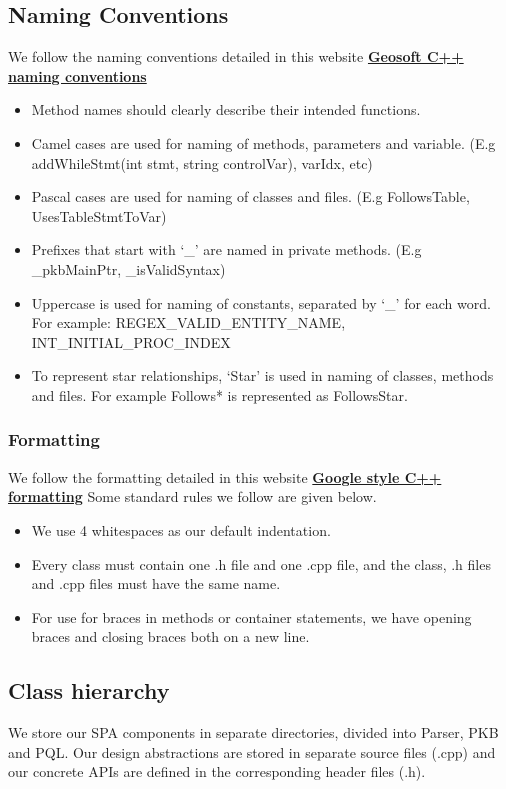 \documentclass[12pt]{article}
\begin{document}
{{{{{{{{{{\subsection{Naming Conventions}
We follow the naming conventions detailed in this website 
\href{http://geosoft.no/development/cppstyle.html#Naming Conventions}{\textbf{Geosoft C++ naming conventions}}
\begin{itemize}
\item Method names should clearly describe their intended functions. 
\item Camel cases are used for naming of methods, parameters and variable.
(E.g addWhileStmt(int stmt, string controlVar), varIdx, etc)
\item Pascal cases are used for naming of classes and files. (E.g FollowsTable, UsesTableStmtToVar)
\item Prefixes that start with ‘\_’ are named in private methods.
(E.g \_pkbMainPtr, \_isValidSyntax)
\item Uppercase is used for naming of constants, separated by ‘\_’ for each word.
For example: REGEX\_VALID\_ENTITY\_NAME, INT\_INITIAL\_PROC\_INDEX
\item To represent star relationships, ‘Star’ is used in naming of classes, methods and files. For example Follows* is represented as FollowsStar.
\end{itemize}
\subsubsection{Formatting}
We follow the formatting detailed in this website 
\href{https://google.github.io/styleguide/cppguide.html#Formatting}{\textbf{Google style C++ formatting}} 
\newline Some standard rules we follow are given below.
\begin{itemize}
\item We use 4 whitespaces as our default indentation.
\item Every class must contain one .h file and one .cpp file, and the class, .h files and .cpp files must have the same name.
\item For use for braces in methods or container statements, we have opening braces and closing braces both on a new line.
\end{itemize}
\subsection{Class hierarchy}
We store our SPA components in separate directories, divided into Parser, PKB and PQL. Our design abstractions are stored in separate source files (.cpp) and our concrete APIs are defined in the corresponding header files (.h).
}}}}}}}}}}
\end{document}
